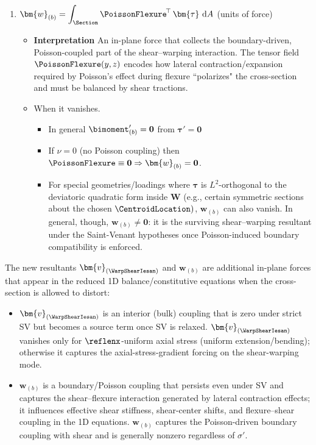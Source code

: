 \begin{enumerate}
\item \(\displaystyle \bm{w}_{(b)}=\int_{\Section}\PoissonFlexure^{\!\top}\,\bm{\tau}\mathrm{~d}A\)  (units of force)

\begin{itemize}

\item \textbf{Interpretation} An in-plane force that collects the boundary-driven, Poisson-coupled part of the shear–warping interaction. 
The tensor field \(\PoissonFlexure(y,z)\) encodes how lateral contraction/expansion required by Poisson’s effect during flexure ``polarizes" the cross-section and must be balanced by shear tractions. 
\item When it vanishes.
\begin{itemize}
  \item In general \(\bimoment_{(b)}' = \mathbf{0}\) from \(\bm{\tau}' = \mathbf{0}\)
  \item If \(\nu=0\) (no Poisson coupling) then \(\PoissonFlexure\equiv\mathbf{0}\Rightarrow \bm{w}_{(b)}=\mathbf{0}\).
  \item For special geometries/loadings where \(\bm{\tau}\) is \(L^2\)-orthogonal to the deviatoric quadratic form inside \(\bm{W}\) (e.g., certain symmetric sections about the chosen \(\CentroidLocation)\), \(\bm{w}_{(b)}\) can also vanish.
  In general, though, \(\bm{w}_{(b)}\neq\mathbf{0}\): it is the surviving shear–warping resultant under the Saint-Venant hypotheses once Poisson-induced boundary compatibility is enforced.
\end{itemize}
\end{itemize}

\end{enumerate}

The new resultants \(\bm{v}_{(\WarpShearIesan)}\) and \(\bm{w}_{(b)}\) are additional in-plane forces that appear in the reduced 1D balance/constitutive equations when the cross-section is allowed to distort:
\begin{itemize}
  \item \(\bm{v}_{(\WarpShearIesan)}\) is an interior (bulk) coupling that is zero under strict SV but becomes a source term once SV is relaxed. 
  \(\bm{v}_{(\WarpShearIesan)}\) vanishes only for \(\reflenx\)-uniform axial stress (uniform extension/bending); otherwise it captures the axial-stress-gradient forcing on the shear-warping mode.
  \item \(\bm{w}_{(b)}\) is a boundary/Poisson coupling that persists even under SV and captures the shear–flexure interaction generated by lateral contraction effects; it influences effective shear stiffness, shear-center shifts, and flexure–shear coupling in the 1D equations.
  \(\bm{w}_{(b)}\) captures the Poisson-driven boundary coupling with shear and is generally nonzero regardless of \(\sigma'\). 
\end{itemize}
